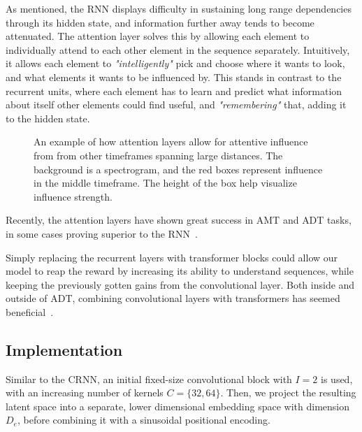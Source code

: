 As mentioned, the \gls{RNN} displays difficulty in sustaining long range dependencies through its hidden state, and information further away tends to become attenuated. The attention layer solves this by allowing each element to individually attend to each other element in the sequence separately. Intuitively, it allows each element to \textit{"intelligently"} pick and choose where it wants to look, and what elements it wants to be influenced by. This stands in contrast to the recurrent units, where each element has to learn and predict what information about itself other elements could find useful, and \textit{"remembering"} that, adding it to the hidden state.

\begin{figure}[H]
    \centering
    
    \caption{An example of how attention layers allow for attentive influence from from other timeframes spanning large distances. The background is a spectrogram, and the red boxes represent influence in the middle timeframe. The height of the box help visualize influence strength.}
    \label{CTInfluenceFigure}
\end{figure}


Recently, the attention layers have shown great success in \gls{AMT} and \gls{ADT} tasks, in some cases proving superior to the \gls{RNN}~\cite{gardner2022mt3multitaskmultitrackmusic, chang2024yourmt3+, zehren2024analyzingreducingsynthetictorealtransfer}.

Simply replacing the recurrent layers with transformer blocks could allow our model to reap the reward by increasing its ability to understand sequences, while keeping the previously gotten gains from the convolutional layer. Both inside and outside of \gls{ADT}, combining convolutional layers with transformers has seemed beneficial~\cite{zehren2024analyzingreducingsynthetictorealtransfer, gulati2020conformerconvolutionaugmentedtransformerspeech}.

\subsection{Implementation}

Similar to the \gls{CRNN}, an initial fixed-size convolutional block with $I = 2$ is used, with an increasing number of kernels $C = \{32, 64\}$. Then, we project the resulting latent space into a separate, lower dimensional embedding space with dimension $D_e$, before combining it with a sinusoidal positional encoding. 

